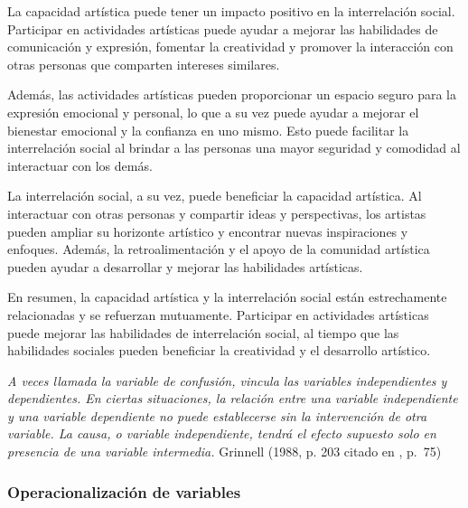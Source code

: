 \documentclass[12pt,a4paper]{article}
\begin{document}
\begin{itemize}
  La capacidad artística puede tener un impacto positivo en la interrelación social. Participar en actividades artísticas puede ayudar a mejorar las habilidades de comunicación y expresión, fomentar la creatividad y promover la interacción con otras personas que comparten intereses similares.
  
  Además, las actividades artísticas pueden proporcionar un espacio seguro para la expresión emocional y personal, lo que a su vez puede ayudar a mejorar el bienestar emocional y la confianza en uno mismo. Esto puede facilitar la interrelación social al brindar a las personas una mayor seguridad y comodidad al interactuar con los demás.
  
  La interrelación social, a su vez, puede beneficiar la capacidad artística. Al interactuar con otras personas y compartir ideas y perspectivas, los artistas pueden ampliar su horizonte artístico y encontrar nuevas inspiraciones y enfoques. Además, la retroalimentación y el apoyo de la comunidad artística pueden ayudar a desarrollar y mejorar las habilidades artísticas.
  
  En resumen, la capacidad artística y la interrelación social están estrechamente relacionadas y se refuerzan mutuamente. Participar en actividades artísticas puede mejorar las habilidades de interrelación social, al tiempo que las habilidades sociales pueden beneficiar la creatividad y el desarrollo artístico.
  

\begin{displayquote}
\emph{A veces llamada la variable de confusión, vincula las variables independientes y dependientes. En ciertas situaciones, la relación entre una variable independiente y una variable dependiente no puede establecerse sin la intervención de otra variable. La causa, o variable independiente, tendrá el efecto supuesto solo en presencia de una variable intermedia.} Grinnell (1988, p. 203 citado en \citeauthor{kumar}, p.~75)
\end{displayquote}

\end{itemize}

\subsubsection{Operacionalización de variables}
\end{document}
